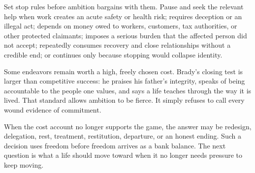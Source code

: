 Set stop rules before ambition bargains with them. Pause and seek the relevant
help when work creates an acute safety or health risk; requires deception or an
illegal act; depends on money owed to workers, customers, tax authorities, or
other protected claimants; imposes a serious burden that the affected person
did not accept; repeatedly consumes recovery and close relationships without a
credible end; or continues only because stopping would collapse identity.

Some endeavors remain worth a high, freely chosen cost. Brady's closing test is
larger than competitive success: he praises his father's integrity, speaks of
being accountable to the people one values, and says a life teaches through
the way it is lived. That standard allows ambition to be fierce. It simply
refuses to call every wound evidence of commitment.

When the cost account no longer supports the game, the answer may be redesign,
delegation, rest, treatment, restitution, departure, or an honest ending. Such
a decision uses freedom before freedom arrives as a bank balance. The next
question is what a life should move toward when it no
longer needs pressure to keep moving.
